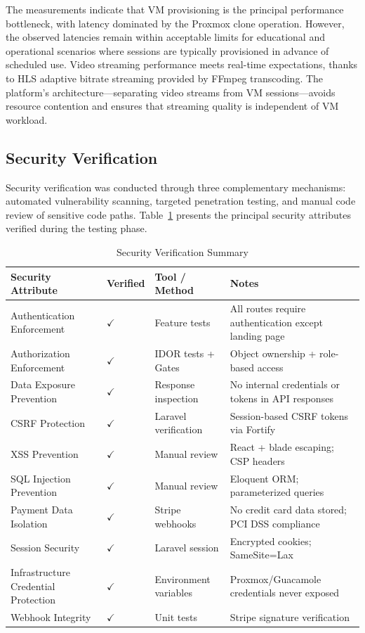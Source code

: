 The measurements indicate that VM provisioning is the principal performance bottleneck, with latency dominated by the Proxmox clone operation. However, the observed latencies remain within acceptable limits for educational and operational scenarios where sessions are typically provisioned in advance of scheduled use. Video streaming performance meets real-time expectations, thanks to HLS adaptive bitrate streaming provided by FFmpeg transcoding. The platform's architecture---separating video streams from VM sessions---avoids resource contention and ensures that streaming quality is independent of VM workload.

\subsection{Security Verification}

Security verification was conducted through three complementary mechanisms: automated vulnerability scanning, targeted penetration testing, and manual code review of sensitive code paths. Table~\ref{tab:security-verification} presents the principal security attributes verified during the testing phase.

\begin{table}[H]
\centering
\caption{Security Verification Summary}
\label{tab:security-verification}
\begin{tabular}{|p{4cm}|p{3cm}|p{3cm}|p{4.5cm}|}
\hline
\textbf{Security Attribute} & \textbf{Verified} & \textbf{Tool / Method} & \textbf{Notes} \\
\hline
Authentication Enforcement & $\checkmark$ & Feature tests & All routes require authentication except landing page \\
\hline
Authorization Enforcement & $\checkmark$ & IDOR tests + Gates & Object ownership + role-based access \\
\hline
Data Exposure Prevention & $\checkmark$ & Response inspection & No internal credentials or tokens in API responses \\
\hline
CSRF Protection & $\checkmark$ & Laravel verification & Session-based CSRF tokens via Fortify \\
\hline
XSS Prevention & $\checkmark$ & Manual review & React + blade escaping; CSP headers \\
\hline
SQL Injection Prevention & $\checkmark$ & Manual review & Eloquent ORM; parameterized queries \\
\hline
Payment Data Isolation & $\checkmark$ & Stripe webhooks & No credit card data stored; PCI DSS compliance \\
\hline
Session Security & $\checkmark$ & Laravel session & Encrypted cookies; SameSite=Lax \\
\hline
Infrastructure Credential Protection & $\checkmark$ & Environment variables & Proxmox/Guacamole credentials never exposed \\
\hline
Webhook Integrity & $\checkmark$ & Unit tests & Stripe signature verification \\
\hline
\end{tabular}
\end{table}

